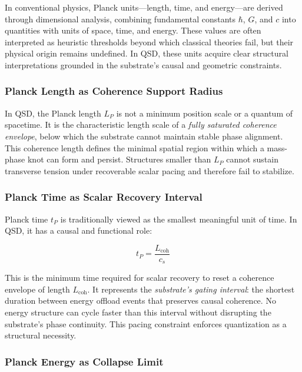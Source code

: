 \documentclass[entropy,article,submit,pdftex,moreauthors]{Definitions/mdpi}
\begin{document}
In conventional physics, Planck units---length, time, and energy---are derived through dimensional analysis, combining fundamental constants $\hbar$, $G$, and $c$ into quantities with units of space, time, and energy. These values are often interpreted as heuristic thresholds beyond which classical theories fail, but their physical origin remains undefined. In QSD, these units acquire clear structural interpretations grounded in the substrate’s causal and geometric constraints.

\subsubsection{Planck Length as Coherence Support Radius}

In QSD, the Planck length $L_P$ is not a minimum position scale or a quantum of spacetime. It is the characteristic length scale of a \textit{fully saturated coherence envelope}, below which the substrate cannot maintain stable phase alignment. This coherence length defines the minimal spatial region within which a mass-phase knot can form and persist. Structures smaller than $L_P$ cannot sustain transverse tension under recoverable scalar pacing and therefore fail to stabilize.

\subsubsection{Planck Time as Scalar Recovery Interval}

Planck time $t_P$ is traditionally viewed as the smallest meaningful unit of time. In QSD, it has a causal and functional role:

\begin{equation}
t_P = \frac{L_{\text{coh}}}{c_s}
\end{equation}

This is the minimum time required for scalar recovery to reset a coherence envelope of length $L_{\text{coh}}$. It represents the \textit{substrate's gating interval}: the shortest duration between energy offload events that preserves causal coherence. No energy structure can cycle faster than this interval without disrupting the substrate’s phase continuity. This pacing constraint enforces quantization as a structural necessity.

\subsubsection{Planck Energy as Collapse Limit}
\end{document}
